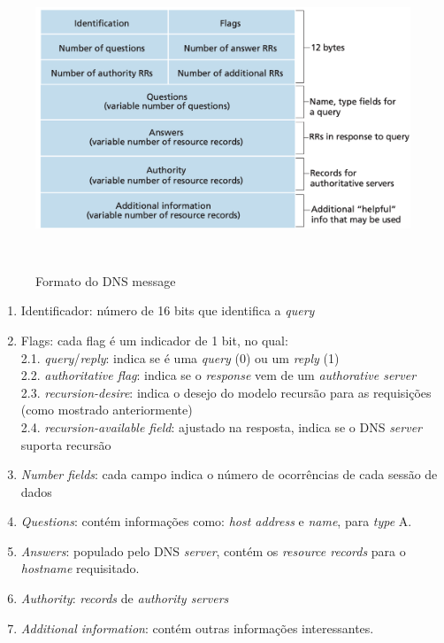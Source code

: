 \begin{figure}[H]
\centering
\includegraphics[keepaspectratio, width=12cm, height=9cm]{imagens/10/10 - DNS message format.png}
\caption{Formato do DNS message\\}
\label{Formato do DNS message}
\end{figure}


\begin{enumerate}
\def\labelenumi{\arabic{enumi}.}
\tightlist
\item
  Identificador: número de 16 bits que identifica a \emph{query}
\item
  Flags: cada flag é um indicador de 1 bit, no qual:\\
  2.1. \emph{query}/\emph{reply}: indica se é uma \emph{query} (0) ou um
  \emph{reply} (1)\\
  2.2. \emph{authoritative flag}: indica se o \emph{response} vem de um
  \emph{authorative server}\\
  2.3. \emph{recursion-desire}: indica o desejo do modelo recursão para
  as requisições (como mostrado anteriormente)\\
  2.4. \emph{recursion-available field}: ajustado na resposta, indica se
  o DNS \emph{server} suporta recursão
\item
  \emph{Number fields}: cada campo indica o número de ocorrências de
  cada sessão de dados
\item
  \emph{Questions}: contém informações como: \emph{host address} e
  \emph{name}, para \emph{type} A.
\item
  \emph{Answers}: populado pelo DNS \emph{server}, contém os
  \emph{resource records} para o \emph{hostname} requisitado.
\item
  \emph{Authority}: \emph{records} de \emph{authority servers}
\item
  \emph{Additional information}: contém outras informações
  interessantes.
\end{enumerate}

